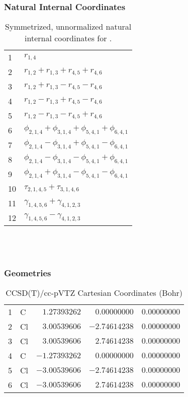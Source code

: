 \documentclass[10pt,oneside]{article}
\begin{document}
\subsubsection*{Natural Internal Coordinates}
\begin{table}[h!]
\centering
\caption{Symmetrized, unnormalized natural internal coordinates for .}
\small
\begin{tabular}{ll}
  1   & $r_{1,4}$ \\
  2   & $r_{1,2} + r_{1,3} + r_{4,5} + r_{4,6}$ \\
  3   & $r_{1,2} + r_{1,3} - r_{4,5} - r_{4,6}$ \\
  4   & $r_{1,2} - r_{1,3} + r_{4,5} - r_{4,6}$ \\
  5   & $r_{1,2} - r_{1,3} - r_{4,5} + r_{4,6}$ \\
  6   & $\phi_{2,1,4} + \phi_{3,1,4} + \phi_{5,4,1} + \phi_{6,4,1}$ \\
  7   & $\phi_{2,1,4} - \phi_{3,1,4} + \phi_{5,4,1} - \phi_{6,4,1}$ \\
  8   & $\phi_{2,1,4} - \phi_{3,1,4} - \phi_{5,4,1} + \phi_{6,4,1}$ \\
  9   & $\phi_{2,1,4} + \phi_{3,1,4} - \phi_{5,4,1} - \phi_{6,4,1}$ \\
  10  & $\tau_{2,1,4,5} + \tau_{3,1,4,6}$ \\
  11  & $\gamma_{1,4,5,6} + \gamma_{4,1,2,3}$ \\
  12  & $\gamma_{1,4,5,6} - \gamma_{4,1,2,3}$ \\
\end{tabular}
\end{table}

\clearpage

\subsection{\ \ \ }

\subsubsection*{Geometries}
\begin{table}[h!]
\centering
\caption{CCSD(T)/cc-pVTZ Cartesian Coordinates (Bohr)}
\begin{tabular}{llrrr}
1  & C  & $ 1.27393262$ & $ 0.00000000$ & $ 0.00000000$ \\
2  & Cl & $ 3.00539606$ & $-2.74614238$ & $ 0.00000000$ \\
3  & Cl & $ 3.00539606$ & $ 2.74614238$ & $ 0.00000000$ \\
4  & C  & $-1.27393262$ & $ 0.00000000$ & $ 0.00000000$ \\
5  & Cl & $-3.00539606$ & $-2.74614238$ & $ 0.00000000$ \\
6  & Cl & $-3.00539606$ & $ 2.74614238$ & $ 0.00000000$ \\
\end{tabular}
\end{table}
\end{document}
